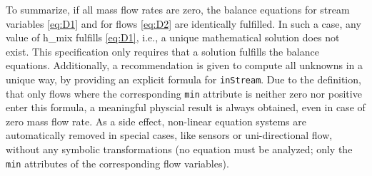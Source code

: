 To summarize, if all mass flow rates are zero, the balance equations for
stream variables \eqref{eq:D1} and for flows \eqref{eq:D2} are identically fulfilled. In
such a case, any value of h\_mix fulfills \eqref{eq:D1}, i.e., a unique
mathematical solution does not exist. This specification only requires
that a solution fulfills the balance equations. Additionally, a
recommendation is given to compute all unknowns in a unique way, by
providing an explicit formula for \lstinline!inStream!. Due to the
definition, that only flows where the corresponding \lstinline!min! attribute is
neither zero nor positive enter this formula, a meaningful physcial
result is always obtained, even in case of zero mass flow rate. As a
side effect, non-linear equation systems are automatically removed in
special cases, like sensors or uni-directional flow, without any
symbolic transformations (no equation must be analyzed; only the
\lstinline!min! attributes of the corresponding flow variables).
